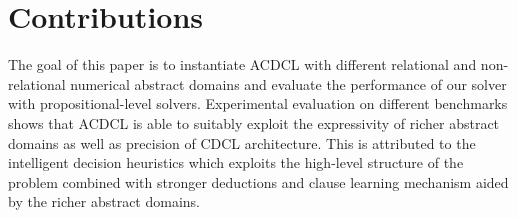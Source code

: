 \section{Contributions}\label{contribution}
The goal of this paper is to instantiate ACDCL with 
different relational and non-relational numerical abstract 
domains and evaluate the performance of our solver with 
propositional-level solvers. Experimental evaluation on different
benchmarks shows that ACDCL is able to suitably exploit the 
expressivity of richer abstract domains as well as precision 
of CDCL architecture. This is attributed to the intelligent decision
heuristics which exploits the high-level structure of the problem 
combined with stronger deductions and clause learning mechanism aided 
by the richer abstract domains.
